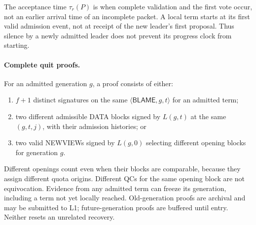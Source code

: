 \documentclass[11pt,a4paper]{article}
\newcommand{\tagg}[1]{\ensuremath{\mathsf{#1}}}
\begin{document}
The acceptance time $\tau_r(P)$ is when complete validation and the first
vote occur, not an earlier arrival time of an incomplete packet. A local
term starts at its first valid admission event, not at receipt of the
new leader's first proposal. Thus silence by a newly admitted leader does
not prevent its progress clock from starting.

\paragraph{Complete quit proofs.}
For an admitted generation $g$, a proof consists of either:
\begin{enumerate}[label=(\alph*)]
\item $f+1$ distinct signatures on the same $\langle\tagg{BLAME},g,t\rangle$
for an admitted term;
\item two different admissible DATA blocks signed by $L(g,t)$ at the same
$(g,t,j)$, with their admission histories; or
\item two valid NEWVIEWs signed by $L(g,0)$ selecting different opening
blocks for generation $g$.
\end{enumerate}
Different openings count even when their blocks are comparable, because
they assign different quota origins. Different QCs for the same opening
block are not equivocation. Evidence from any admitted term can freeze
its generation, including a term not yet locally reached. Old-generation
proofs are archival and may be submitted to L1; future-generation proofs
are buffered until entry. Neither resets an unrelated recovery.
\end{document}
